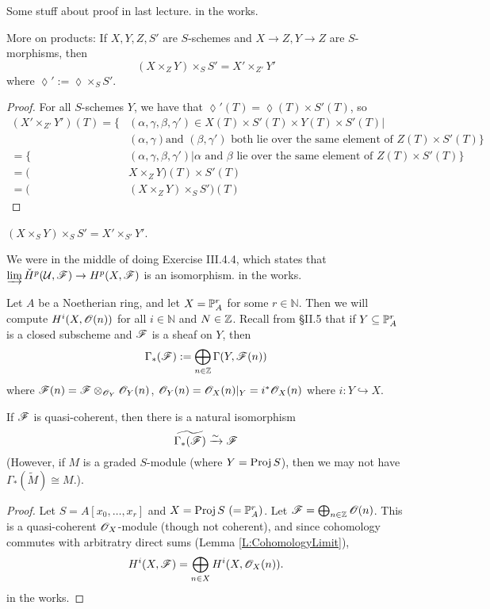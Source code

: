  \setcounter{lecture}{13}


Some stuff about proof in last lecture. in the works.

More on products: If $X,Y,Z,S'$ are $S$-schemes and $X\to Z,Y\to
Z$ are $S$-morphisms, then \[
    (X\times_Z Y)\times _S S' = X' \times_{Z'} Y'
\] where $\lozenge':=\lozenge\times_S S'$. \begin{proof} For all
$S$-schemes $Y$, we have that $\lozenge'(T) = \lozenge(T)\times
S'(T)$, so \begin{align*}
 (X'\times_{Z'} Y')(T) = \{&(\alpha,\gamma,\beta,\gamma') \in
 X(T)\times S'(T)\times Y(T)\times S'(T) |  \\ &(\alpha,\gamma)\text{
 and }(\beta,\gamma')\text{ both lie over the same element of } Z(T)\times
 S'(T)\} \\
 = \{&(\alpha,\gamma,\beta,\gamma') | \alpha\text{ and }
 \beta\text{ lie over the same element of } Z(T)\times S'(T)\} \\
 = (&X\times_Z Y)(T) \times S'(T)\\
 = (&(X\times_Z Y)\times_S S')(T)
\end{align*} \end{proof}

\begin{corollary} $(X\times_S Y)\times_S S' = X'\times_{S'}Y'$.
\end{corollary}

We were in the middle of doing Exercise III.4.4, which states that
$\varinjlim \check H^p(\U,\F) \to H^p(X,\F)$ is an isomorphism. in
the works.


Let $A$ be a Noetherian ring, and let $X=\P^r_A$ for some $r\in
\mathbb{N}$.  Then we will compute $H^i(X,\O(n))$ for all $i\in
\mathbb{N}$ and $N\in \Z$.  Recall from \S II.5 that if
$Y\subseteq \P^r_A $ is a closed subscheme and $\F$ is a sheaf on
$Y$, then \[
    \Gamma_*(\F):= \bigoplus_{n\in \Z} \Gamma(Y,\F(n))
\] where $\F(n)=\F\otimes_{\O_Y}\O_Y(n)$, $\O_Y(n)=\O_X(n)|_Y =
i^*\O_X(n)$ where $i:Y\hookrightarrow X$.

\begin{theorem} If $\F$ is quasi-coherent, then there is a natural
isomorphism \[
    \widetilde{\Gamma_*(\F)} \xrightarrow{\sim} \F
\] (However, if $M$ is a graded $S$-module (where $Y=\proj S$),
then we may not have $\Gamma_*(\tilde M) \cong M$.). \end{theorem}
\begin{proof}
 Let $S=A[x_0,\dots,x_r]$ and $X=\proj S\ (=\P^r_A)$.
Let $\F=\bigoplus_{n\in \Z}\O(n)$.  This is a quasi-coherent
$\O_X$-module (though not coherent), and since cohomology commutes
with arbitratry direct sums (Lemma \ref{L:CohomologyLimit}),
 \[
    H^i(X,\F) = \bigoplus_{n\in X} H^i(X,\O_X(n)).
 \]
 in the works.

\renewcommand{\qedsymbol}{\text{\tiny proof continued in next
lecture}}
 \end{proof}
